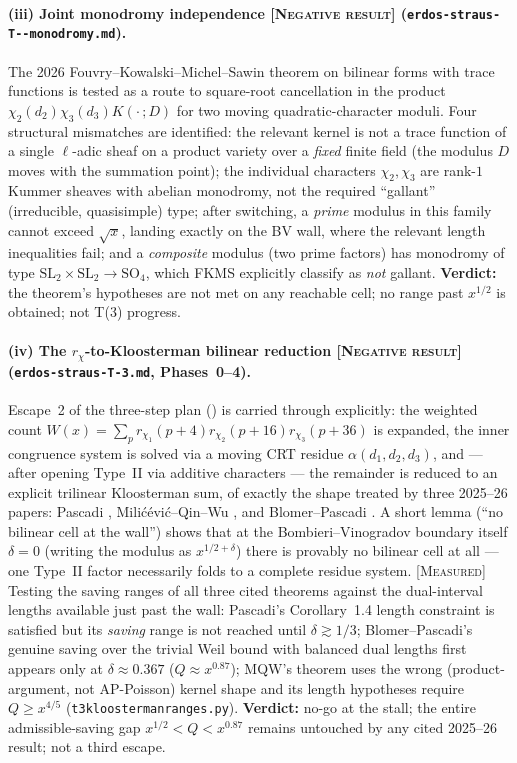 \documentclass[11pt]{article}
\theoremstyle{plain}
\theoremstyle{definition}
\theoremstyle{remark}
\newcommand{\NEGATIVE}{\textcolor{negative}{\textsc{[Negative result]}}}
\newcommand{\MEASURED}{\textcolor{claimed}{\textsc{[Measured]}}}
\newcommand{\file}[1]{\texttt{#1}}
\renewcommand{\_}{\textunderscore\allowbreak}
\begin{document}
\paragraph{(iii) Joint monodromy independence \NEGATIVE{} (\texttt{erdos-\allowbreak straus-\allowbreak T--\allowbreak monodromy.md}).}
The 2026 Fouvry--Kowalski--Michel--Sawin theorem on bilinear forms with trace functions
\cite{FKMS2026} is tested as a route to square-root cancellation in the product
$\chi_2(d_2)\chi_3(d_3)K(\cdot\,;D)$ for two moving quadratic-character moduli. Four structural
mismatches are identified: the relevant kernel is not a trace function of a single
$\ell$-adic sheaf on a product variety over a \emph{fixed} finite field (the modulus $D$ moves
with the summation point); the individual characters $\chi_2,\chi_3$ are rank-$1$ Kummer sheaves
with abelian monodromy, not the required ``gallant'' (irreducible, quasisimple) type; after
switching, a \emph{prime} modulus in this family cannot exceed $\sqrt x$, landing exactly on the
BV wall, where the relevant length inequalities fail; and a \emph{composite} modulus (two prime
factors) has monodromy of type $\mathrm{SL}_2\times\mathrm{SL}_2\to\mathrm{SO}_4$, which FKMS
explicitly classify as \emph{not} gallant. \textbf{Verdict:} the theorem's hypotheses are not
met on any reachable cell; no range past $x^{1/2}$ is obtained; not T(3) progress.

\paragraph{(iv) The $r_\chi$-to-Kloosterman bilinear reduction \NEGATIVE{} (\file{erdos-straus-T-3.md}, Phases~0--4).}
Escape~2 of the three-step plan () is carried through explicitly: the weighted
count $W(x)=\sum_p r_{\chi_1}(p+4)r_{\chi_2}(p+16)r_{\chi_3}(p+36)$ is expanded, the inner
congruence system is solved via a moving CRT residue $\alpha(d_1,d_2,d_3)$, and — after opening
Type~II via additive characters — the remainder is reduced to an explicit trilinear Kloosterman
sum, of exactly the shape treated by three 2025--26 papers: Pascadi \cite{Pascadi2026},
Milić\'evi\'c--Qin--Wu \cite{MQW2026}, and Blomer--Pascadi \cite{BlomerPascadi2026}. A short
lemma (``no bilinear cell at the wall'') shows that at the Bombieri--Vinogradov boundary itself
$\delta=0$ (writing the modulus as $x^{1/2+\delta}$) there is provably no bilinear cell at all —
one Type~II factor necessarily folds to a complete residue system. \MEASURED{} Testing the
saving ranges of all three cited theorems against the dual-interval lengths available just past
the wall: Pascadi's Corollary~1.4 length constraint is satisfied but its \emph{saving} range is
not reached until $\delta\gtrsim1/3$; Blomer--Pascadi's genuine saving over the trivial Weil
bound with balanced dual lengths first appears only at $\delta\approx0.367$
($Q\approx x^{0.87}$); MQW's theorem uses the wrong (product-argument, not AP-Poisson) kernel
shape and its length hypotheses require $Q\ge x^{4/5}$ (\file{t3\_kloosterman\_ranges.py}).
\textbf{Verdict:} no-go at the stall; the entire admissible-saving gap $x^{1/2}<Q<x^{0.87}$
remains untouched by any cited 2025--26 result; not a third escape.
\end{document}
